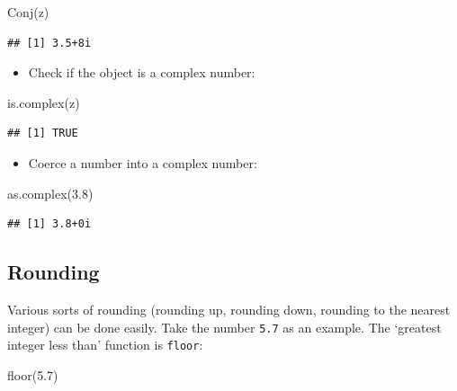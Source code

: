 \documentclass[
]{book}
\newenvironment{Shaded}{\begin{snugshade}}{\end{snugshade}}
\newcommand{\FloatTok}[1]{\textcolor[rgb]{0.00,0.00,0.81}{#1}}
\newcommand{\FunctionTok}[1]{\textcolor[rgb]{0.00,0.00,0.00}{#1}}
\newcommand{\NormalTok}[1]{#1}
\providecommand{\tightlist}{%
  \setlength{\itemsep}{0pt}\setlength{\parskip}{0pt}}
\theoremstyle{definition}
\theoremstyle{definition}
\theoremstyle{definition}
\theoremstyle{definition}
\theoremstyle{remark}
\begin{document}
\begin{Shaded}
\begin{Highlighting}[]
\FunctionTok{Conj}\NormalTok{(z)}
\end{Highlighting}
\end{Shaded}

\begin{verbatim}
## [1] 3.5+8i
\end{verbatim}

\begin{itemize}
\tightlist
\item
  Check if the object is a complex number:
\end{itemize}

\begin{Shaded}
\begin{Highlighting}[]
\FunctionTok{is.complex}\NormalTok{(z)}
\end{Highlighting}
\end{Shaded}

\begin{verbatim}
## [1] TRUE
\end{verbatim}

\begin{itemize}
\tightlist
\item
  Coerce a number into a complex number:
\end{itemize}

\begin{Shaded}
\begin{Highlighting}[]
\FunctionTok{as.complex}\NormalTok{(}\FloatTok{3.8}\NormalTok{)}
\end{Highlighting}
\end{Shaded}

\begin{verbatim}
## [1] 3.8+0i
\end{verbatim}

\hypertarget{rounding}{%
\subsection{Rounding}\label{rounding}}

Various sorts of rounding (rounding up, rounding down, rounding to the nearest integer) can be done easily. Take the number \texttt{5.7} as an example. The `greatest integer less than' function is \texttt{floor}:

\begin{Shaded}
\begin{Highlighting}[]
\FunctionTok{floor}\NormalTok{(}\FloatTok{5.7}\NormalTok{)}
\end{Highlighting}
\end{Shaded}
\end{document}
